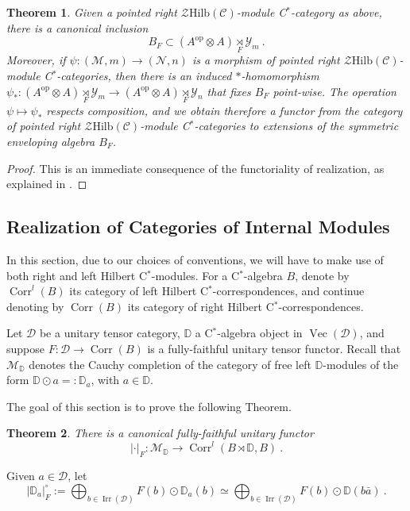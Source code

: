 \documentclass[a4paper,11pt,reqno]{amsart}
\numberwithin{equation}{section}
\newtheorem{theorem}{Theorem}[section]
\theoremstyle{remark}
\theoremstyle{definition}
\newcommand{\bD}{\mathbb D}
\newcommand{\cC}{\mathcal C}
\newcommand{\cD}{\mathcal D}
\newcommand{\cM}{\mathcal M}
\newcommand{\cN}{\mathcal N}
\newcommand{\cY}{\mathcal Y}
\newcommand{\cZ}{\mathcal Z}
\DeclareMathOperator{\Irr}{Irr}
\DeclareMathOperator{\Vect}{Vec}
\DeclareMathOperator{\Corr}{Corr}
\newcommand\op{\text{op}}
\newcommand{\Hilb}{\mathrm{Hilb}}
\begin{document}
\begin{theorem}
	Given a pointed right $\cZ \Hilb(\cC)$-module C$^*$-category as above, there is a canonical inclusion
	\[
	B_F \subset (A^{\op} \otimes A) \underset{F}{\rtimes} \cY_m \ .
	\]
	Moreover, if $\psi: (\cM, m) \to (\cN,n)$ is a morphism of pointed right $\cZ \Hilb(\cC)$-module C$^*$-categories, then there is an induced $*$-homomorphism $\psi_*: (A^{\op} \otimes A) \underset{F}{\rtimes} \cY_m \to (A^{\op} \otimes A) \underset{F}{\rtimes} \cY_n$ that fixes $B_F$ point-wise. The operation $\psi \mapsto \psi_*$ respects composition, and we obtain therefore a functor from the category of pointed right $\cZ \Hilb(\cC)$-module C$^*$-categories to extensions of the symmetric enveloping algebra $B_F$.
	\label{thm:extensionsofsymmetricenvelopingalgebra}
\end{theorem}
\begin{proof}
	This is an immediate consequence of the functoriality of realization, as explained in \cite{Hataishi_Palomares_2025}.
\end{proof}

\subsection{Realization of Categories of Internal Modules}

In this section, due to our choices of conventions, we will have to make use of both right and left Hilbert C$^*$-modules. For a C$^*$-algebra $B$, denote by $\Corr^l(B)$ its category of left Hilbert C$^*$-correspondences, and continue denoting by $\Corr(B)$ its category of right Hilbert C$^*$-correspondences. 

Let $\cD$ be a unitary tensor category, $\bD$ a C$^*$-algebra object in $\Vect(\cD)$, and suppose $F: \cD \to \Corr(B)$ is a fully-faithful unitary tensor functor. Recall that $\cM_\bD$ denotes the Cauchy completion of the category of free left $\bD$-modules of the form $\bD \odot a =: \bD_a$, with $a \in \bD$.

The goal of this section is to prove the following Theorem.

\begin{theorem}
	There is a canonical fully-faithful unitary functor
	\[ | \cdot |_F : \cM_\bD \to \Corr^l(B \rtimes \bD, B) \ . \]
	\label{thm:realizationofcategoriesofinternalmodules}
\end{theorem}

Given $a \in \cD$, let
\[
| \bD_a |_F^\circ := \bigoplus_{b \in \Irr(\cD)} F(b) \odot \bD_a(b) \simeq \bigoplus_{b \in \Irr(\cD)} F(b) \odot \bD(b \bar{a}) \ .\]
\end{document}

